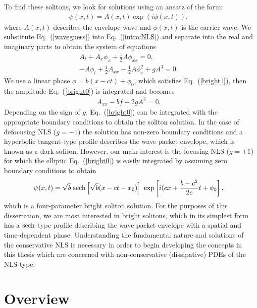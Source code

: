 To find these solitons, we look for solutions using an ansatz of the form:
\begin{align}
\psi (x,t) = A(x,t) \exp(i \phi(x,t)),
\label{waveguess}
\end{align}
where $A(x,t)$ describes the envelope wave and $\phi(x,t)$ is the carrier wave.  We substitute Eq.~(\ref{waveguess}) into Eq.~(\ref{intro:NLS}) and separate into the real and imaginary parts to obtain the system of equations 
\begin{align}
A_t + A_x \phi_x + \frac{1}{2} A \phi_{xx} = 0,\label{bright0} \\
-A \phi_t + \frac{1}{2} A_{xx}  - \frac{1}{2} A \phi_x^2 + g A^3 = 0. 
\label{bright1}
\end{align}
We use a linear phase $\phi = b(x-ct) + \phi_0$, which satisfies Eq.~(\ref{bright1}), then the amplitude Eq.~(\ref{bright0}) is integrated and becomes
\begin{align}
A_{xx} - bf + 2 g A^3=0. 
\label{bright2}
\end{align}
Depending on the sign of $g$, Eq.~(\ref{bright0}) can be integrated with the appropriate boundary conditions to obtain the soliton solution.  In the case of defocusing NLS ($g=-1$) the solution has non-zero boundary conditions and a hyperbolic tangent-type profile describes the wave packet envelope, which is known as a dark soliton.  However, our main interest is the focusing NLS ($g = +1$) for which the elliptic Eq.~(\ref{bright0}) is easily integrated by assuming zero boundary conditions to obtain 
\begin{align}
\psi(x,t) = \sqrt{b} \;  {\rm sech} \left[\sqrt{b} (x-ct - x_0) \right] \; \exp \left[ i (cx + \frac{b - c^2}{2c} t + \phi_0\right], 
\end{align}
which is a four-parameter bright soliton solution.  For the purposes of this dissertation, we are most interested in bright solitons, which in its simplest form has a ${\rm sech}$-type profile describing the wave packet envelope with a spatial and time-dependent phase.  Understanding the fundamental nature and solutions of the conservative NLS is necessary in order to begin developing the concepts in this thesis which are concerned with non-conservative (dissipative) PDEs of the NLS-type. 


\section{Overview} %
\label{sec:NLS}

